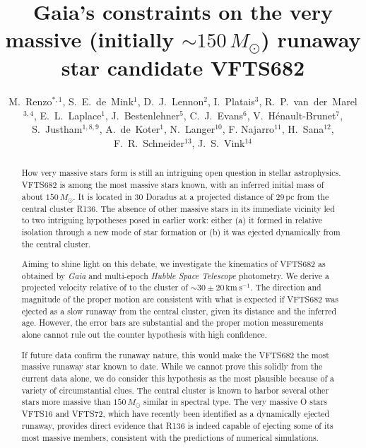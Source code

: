 \documentclass[apjl,twocolumn]{emulateapj}
\newcommand{\kms}{{\,\mathrm{km\ s^{-1}}}}
\begin{document}
\title{Gaia's constraints on the very massive  (initially $\sim$$150\,M_\odot$) runaway star candidate VFTS682}

\author{M.~Renzo$^{*,1}$, S.~E.~de~Mink$^{1}$, D.~J.~Lennon$^{2}$, I.~Platais$^{3}$,
  R.~P.~van~der~Marel$^{3,4}$, E.~L.~Laplace$^{1}$,
  J.~Bestenlehner$^{5}$, C.~J.~Evans$^{6}$,
  V.~H\'enault-Brunet$^{7}$,  S.~Justham$^{1,8,9}$,  A.~de~Koter$^{1}$,
  N.~Langer$^{10}$, F. Najarro$^{11}$, H.~Sana$^{12}$, F.~R.~Schneider$^{13}$, J.~S.~Vink$^{14}$}

\begin{abstract}
 
 How very massive stars form is still an intriguing open question in stellar astrophysics.  VFTS682 is among the most massive stars known, with an inferred initial mass of about  $150\,M_\odot$. It is located in 30 Doradus at a projected distance of 29\,pc from the central cluster R136.  The absence of other massive stars in its immediate vicinity led to two intriguing hypotheses posed in earlier work: either (a) it formed in relative isolation through a new mode of star formation or (b) it was ejected dynamically from the central cluster. 
 
Aiming to shine light on this debate, we investigate the kinematics of
VFTS682 as obtained by \emph{Gaia} and multi-epoch \emph{Hubble Space
  Telescope} photometry. We derive a projected velocity relative of to
the cluster of $\sim$$30\pm20\kms$.  The direction and magnitude of
the proper motion are consistent with what is expected if VFTS682 was ejected as a slow runaway from the central cluster, given its distance and the inferred age.  However, the error bars are substantial and the proper motion measurements alone cannot rule out the counter hypothesis with high confidence.   
 
If future data confirm the runaway nature, this would make the VFTS682
the most massive runaway star known to date.  While we cannot prove
this solidly from the current data alone, we do consider this
hypothesis as the most plausible because of a variety of
circumstantial clues. The central cluster is known to harbor several
other stars more massive than $150\,M_\odot$ similar in spectral type.
The very massive O stars VFTS16 and VFTS72, which have recently been identified as a dynamically ejected runaway, provides direct evidence that R136 is indeed capable of ejecting some of its most massive members, consistent with the predictions of numerical simulations.
\end{abstract}
\end{document}
